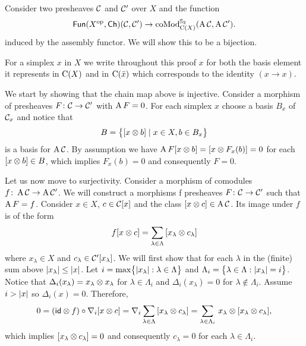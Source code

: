 
Consider two presheaves $\cC$ and $\cC'$ over $X$ and the function
\[
\Fun(X^\op, \Ch)(\cC, \cC') \to \coMod^{\Sym_2}_{\chains(X)}(\assembly \cC, \assembly \cC').
\]
induced by the assembly functor.
We will show this to be a bijection.

For a simplex $x$ in $X$ we write throughout this proof $x$ for both the basis element it represents in $\chains(X)$ and in $\chains(\bar x)$ which corresponds to the identity $(x \to x)$.

We start by showing that the chain map above is injective.
Consider a morphism of presheaves $F \colon \cC \to \cC'$ with $\assembly F = 0$.
For each simplex $x$ choose a basis $B_x$ of $\cC_x$ and notice that
\[
B = \set[\big]{[x \ot b] \mid x \in X, b \in B_x}
\]
is a basis for $\assembly \cC$.
By assumption we have $\assembly F [x \ot b] = [x \ot F_x(b)] = 0$ for each $[x \ot b] \in B$, which implies $F_x(b) = 0$ and consequently $F = 0$.

Let us now move to surjectivity.
Consider a morphism of comodules $f \colon \assembly \cC \to \assembly \cC'$.
We will construct a morphisms f presheaves $F \colon \cC \to \cC'$ such that $\assembly F = f$.
Consider $x \in X$, $c \in \cC[x]$ and the class $[x \ot c] \in \assembly \cC$.
Its image under $f$ is of the form
\[
f[x \ot c] = \sum_{\lambda \in \Lambda} \, [x_\lambda \ot c_\lambda]
\]
where $x_\lambda \in X$ and $c_\lambda \in \cC'[x_\lambda]$.
We will first show that for each $\lambda$ in the (finite) sum above $\bars{x_\lambda} \leq \bars{x}$.
Let $i = \max \set[\big]{\bars{x_\lambda} : \lambda \in \Lambda}$ and $\Lambda_i = \set[\big]{\lambda \in \Lambda : \bars{x_\lambda} = i}$.
Notice that $\Delta_i(x_{\lambda}) = x_{\lambda} \ot x_{\lambda}$ for $\lambda \in \Lambda_i$ and $\Delta_i(x_{\lambda}) = 0$ for $\lambda \notin \Lambda_i$.
Assume $i > \bars{x}$ so $\Delta_i(x) = 0$.
Therefore,
\begin{align*}
	0 =
	(\id \ot f) \circ \nabla_i [x \ot c] =
	\nabla_i \sum_{\lambda \in \Lambda} \, [x_\lambda \ot c_\lambda] =
	\sum_{\lambda \in \Lambda_i} \, x_\lambda \ot [x_\lambda \ot c_\lambda],
\end{align*}
which implies $[x_\lambda \ot c_\lambda] = 0$ and consequently $c_{\lambda} = 0$ for each $\lambda \in \Lambda_i$.

